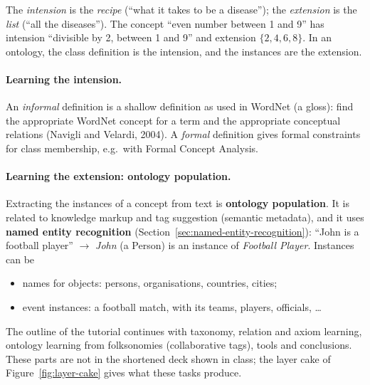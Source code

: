 \begin{nbintuition}
The \emph{intension} is the \emph{recipe} (``what it takes to be a disease''); the
\emph{extension} is the \emph{list} (``all the diseases''). The concept ``even number
between 1 and 9'' has intension ``divisible by 2, between 1 and 9'' and extension
$\{2, 4, 6, 8\}$. In an ontology, the class definition is the intension, and the
instances are the extension.
\end{nbintuition}

\paragraph{Learning the intension.}
An \emph{informal} definition is a shallow definition as used in WordNet (a gloss):
find the appropriate WordNet concept for a term and the appropriate conceptual relations
(Navigli and Velardi, 2004). A \emph{formal} definition gives formal constraints for
class membership, e.g.\ with Formal Concept Analysis.

\paragraph{Learning the extension: ontology population.}
Extracting the instances of a concept from text is \textbf{ontology population}. It is
related to knowledge markup and tag suggestion (semantic metadata), and it uses
\textbf{named entity recognition} (Section~\ref{sec:named-entity-recognition}):
``John is a football player'' $\to$ \emph{John} (a Person) is an instance of
\emph{Football Player}. Instances can be
\begin{itemize}[nosep]
  \item names for objects: persons, organisations, countries, cities;
  \item event instances: a football match, with its teams, players, officials, \ldots
\end{itemize}

\begin{nbwarning}
The outline of the tutorial continues with taxonomy, relation and axiom learning,
ontology learning from folksonomies (collaborative tags), tools and conclusions. These
parts are not in the shortened deck shown in class; the layer cake of
Figure~\ref{fig:layer-cake} gives what these tasks produce.
\end{nbwarning}

